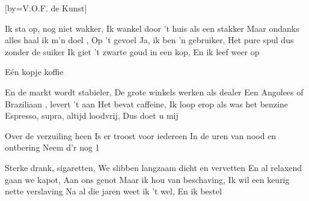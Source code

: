  

[by=V.O.F. de Kunst]




\beginverse
Ik sta op, nog niet wakker, \brk  Ik wankel door 't huis als een stakker
Maar ondanks alles haal ik m’n doel , \brk  Op 't gevoel
Ja, ik ben 'n gebruiker, \brk  Het pure spul dus zonder de suiker
Ik giet 't zwarte goud in een kop, \brk  En ik leef weer op
\endverse

\beginchorus
E\'en kopje koffie
\endchorus


\beginverse
En de markt wordt stabieler, \brk  De grote winkels werken als dealer
Een Angolees of Braziliaan , \brk  levert 't aan
Het bevat caffeine, \brk  Ik loop erop als was het benzine
Espresso, supra, altijd loodvrij, \brk  Dus doet u mij
\endverse


\beginverse
Over de verzuiling heen
Is er troost voor iedereen
In de uren van nood en ontbering
Neem d'r nog 1
\endverse


\beginverse
Sterke drank, sigaretten, \brk  We slibben langzaam dicht en vervetten
En al relaxend gaan we kapot, \brk  Aan ons genot
Maar ik hou van beschaving, \brk  Ik wil een keurig nette verslaving
Na al die jaren weet ik 't wel, \brk  En ik bestel
\endverse



\endsong
